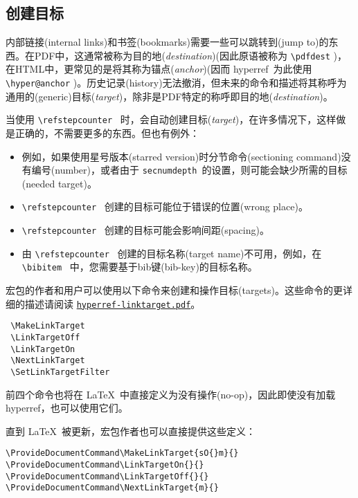 \documentclass{article}
\newcommand*{\cs}[1]{%
  \texttt{\textbackslash #1}%
}
\newcommand*{\xpackage}[1]{\textsf{#1}}
\begin{document}
\subsection[创建目标]{\heiti 创建目标}

内部链接(internal links)和书签(bookmarks)需要一些可以跳转到(jump to)的东西。在PDF中，这通常被称为{\kaiti 目的地}(\emph{destination})(因此原语被称为 \cs{pdfdest})，在HTML中，更常见的是将其称为{\kaiti 锚点}(\emph{anchor})(因而 \xpackage{hyperref}\ 为此使用 \cs{hyper@anchor})。历史记录(history)无法撤消，但未来的命令和描述将其称呼为通用的(generic){\kaiti 目标}(\emph{target})，除非是PDF特定的称呼即{\kaiti 目的地}(\emph{destination})。

当使用 \cs{refstepcounter}\ 时，会自动创建{\kaiti 目标}(\emph{target})，在许多情况下，这样做是正确的，不需要更多的东西。但也有例外：
\begin{itemize}
  \item 例如，如果使用星号版本(starred version)时分节命令(sectioning command)没有编号(number)，或者由于 \texttt{secnumdepth}\ 的设置，则可能会缺少所需的目标(needed target)。
  \item \cs{refstepcounter}\ 创建的目标可能位于错误的位置(wrong place)。
  \item \cs{refstepcounter}\ 创建的目标可能会影响间距(spacing)。
  \item 由 \cs{refstepcounter}\ 创建的目标名称(target name)不可用，例如，在 \cs{bibitem}\ 中，您需要基于bib键(bib-key)的目标名称。
\end{itemize}

宏包的作者和用户可以使用以下命令来创建和操作目标(targets)。这些命令的更详细的描述请阅读 \href{run:hyperref-linktarget.pdf}{\texttt{hyperref-linktarget.pdf}}。

\begin{verbatim}
 \MakeLinkTarget
 \LinkTargetOff
 \LinkTargetOn
 \NextLinkTarget
 \SetLinkTargetFilter
\end{verbatim}

前四个命令也将在 \LaTeX{}\ 中直接定义为没有操作(no-op)，因此即使没有加载 \xpackage{hyperref}，也可以使用它们。

直到 \LaTeX{}\ 被更新，宏包作者也可以直接提供这些定义：

\begin{verbatim}
\ProvideDocumentCommand\MakeLinkTarget{sO{}m}{}
\ProvideDocumentCommand\LinkTargetOn{}{}
\ProvideDocumentCommand\LinkTargetOff{}{}
\ProvideDocumentCommand\NextLinkTarget{m}{}
\end{verbatim}
\end{document}
